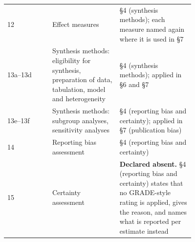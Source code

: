 \begin{table}[htbp]
\begin{tabular}{@{}l p{0.36\linewidth} p{0.40\linewidth}@{}}
12 & \raggedright Effect measures & \raggedright \S4 (synthesis methods); each measure named again where it is used in \S7 \tabularnewline
13a--13d & \raggedright Synthesis methods: eligibility for synthesis, preparation of data, tabulation, model and heterogeneity & \raggedright \S4 (synthesis methods); applied in \S6 and \S7 \tabularnewline
13e--13f & \raggedright Synthesis methods: subgroup analyses, sensitivity analyses & \raggedright \S4 (reporting bias and certainty); applied in \S7 (publication bias) \tabularnewline
14 & \raggedright Reporting bias assessment & \raggedright \S4 (reporting bias and certainty) \tabularnewline
15 & \raggedright Certainty assessment & \raggedright \textbf{Declared absent.} \S4 (reporting bias and certainty) states that no GRADE-style rating is applied, gives the reason, and names what is reported per estimate instead \tabularnewline
\bottomrule
\end{tabular}
\end{table}

